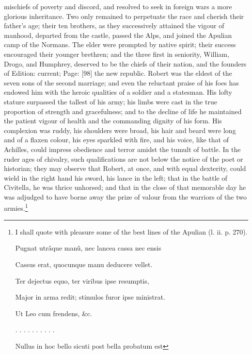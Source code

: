 mischiefs of poverty and discord, and resolved to seek in foreign wars a more glorious inheritance. Two only remained to perpetuate the race and cherish their father\texthebrew{}’s age; their ten brothers, as they successively attained the vigour of manhood, departed from the castle, passed the Alps, and joined the Apulian camp of the Normans. The elder were prompted by native spirit; their success encouraged their younger brethren; and the three first in seniority, William, Drogo, and Humphrey, deserved to be the chiefs of their nation, and the founders of Edition: current; Page: [98] the new republic. Robert was the eldest of the seven sons of the second marriage; and even the reluctant praise of his foes has endowed him with the heroic qualities of a soldier and a statesman. His lofty stature surpassed the tallest of his army; his limbs were cast in the true proportion of strength and gracefulness; and to the decline of life he maintained the patient vigour of health and the commanding dignity of his form. His complexion was ruddy, his shoulders were broad, his hair and beard were long and of a flaxen colour, his eyes sparkled with fire, and his voice, like that of Achilles, could impress obedience and terror amidst the tumult of battle. In the ruder ages of chivalry, such qualifications are not below the notice of the poet or historian; they may observe that Robert, at once, and with equal dexterity, could wield in the right hand his sword, his lance in the left; that in the battle of Civitella, he was thrice unhorsed; and that in the close of that memorable day he was adjudged to have borne away the prize of valour from the warriors of the two armies.\footnote{I shall quote with pleasure some of the best lines of the Apulian (l. ii. p. 270).

Pugnat utrâque manû, nec lancea cassa nec ensis

Cassus erat, quocunque manu deducere vellet.

Ter dejectus equo, ter viribus ipse resumptis,

Major in arma redit; stimulos furor ipse ministrat.

Ut Leo cum frendens, \&c.

. . . . . . . . . .

Nullus in hoc bello sicuti post bella probatum est

}
